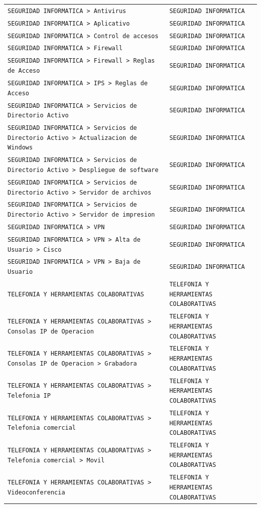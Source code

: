 \begin{longtable}{>{\raggedright\arraybackslash}p{} >{\raggedright\arraybackslash}p{}}
\texttt{SEGURIDAD INFORMATICA > Antivirus} & \texttt{SEGURIDAD INFORMATICA} \\
\texttt{SEGURIDAD INFORMATICA > Aplicativo} & \texttt{SEGURIDAD INFORMATICA} \\
\texttt{SEGURIDAD INFORMATICA > Control de accesos} & \texttt{SEGURIDAD INFORMATICA} \\
\texttt{SEGURIDAD INFORMATICA > Firewall} & \texttt{SEGURIDAD INFORMATICA} \\
\texttt{SEGURIDAD INFORMATICA > Firewall > Reglas de Acceso} & \texttt{SEGURIDAD INFORMATICA} \\
\texttt{SEGURIDAD INFORMATICA > IPS > Reglas de Acceso} & \texttt{SEGURIDAD INFORMATICA} \\
\texttt{SEGURIDAD INFORMATICA > Servicios de Directorio Activo} & \texttt{SEGURIDAD INFORMATICA} \\
\texttt{SEGURIDAD INFORMATICA > Servicios de Directorio Activo > Actualizacion de Windows} & \texttt{SEGURIDAD INFORMATICA} \\
\texttt{SEGURIDAD INFORMATICA > Servicios de Directorio Activo > Despliegue de software} & \texttt{SEGURIDAD INFORMATICA} \\
\texttt{SEGURIDAD INFORMATICA > Servicios de Directorio Activo > Servidor de archivos} & \texttt{SEGURIDAD INFORMATICA} \\
\texttt{SEGURIDAD INFORMATICA > Servicios de Directorio Activo > Servidor de impresion} & \texttt{SEGURIDAD INFORMATICA} \\
\texttt{SEGURIDAD INFORMATICA > VPN} & \texttt{SEGURIDAD INFORMATICA} \\
\texttt{SEGURIDAD INFORMATICA > VPN > Alta de Usuario > Cisco} & \texttt{SEGURIDAD INFORMATICA} \\
\texttt{SEGURIDAD INFORMATICA > VPN > Baja de Usuario} & \texttt{SEGURIDAD INFORMATICA} \\
\texttt{TELEFONIA Y HERRAMIENTAS COLABORATIVAS} & \texttt{TELEFONIA Y HERRAMIENTAS COLABORATIVAS} \\
\texttt{TELEFONIA Y HERRAMIENTAS COLABORATIVAS > Consolas IP de Operacion} & \texttt{TELEFONIA Y HERRAMIENTAS COLABORATIVAS} \\
\texttt{TELEFONIA Y HERRAMIENTAS COLABORATIVAS > Consolas IP de Operacion > Grabadora} & \texttt{TELEFONIA Y HERRAMIENTAS COLABORATIVAS} \\
\texttt{TELEFONIA Y HERRAMIENTAS COLABORATIVAS > Telefonia IP} & \texttt{TELEFONIA Y HERRAMIENTAS COLABORATIVAS} \\
\texttt{TELEFONIA Y HERRAMIENTAS COLABORATIVAS > Telefonia comercial} & \texttt{TELEFONIA Y HERRAMIENTAS COLABORATIVAS} \\
\texttt{TELEFONIA Y HERRAMIENTAS COLABORATIVAS > Telefonia comercial > Movil} & \texttt{TELEFONIA Y HERRAMIENTAS COLABORATIVAS} \\
\texttt{TELEFONIA Y HERRAMIENTAS COLABORATIVAS > Videoconferencia} & \texttt{TELEFONIA Y HERRAMIENTAS COLABORATIVAS} \\
\end{longtable}